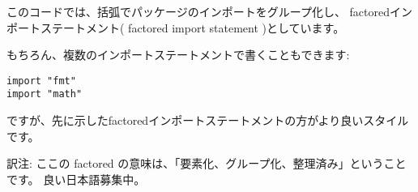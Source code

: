このコードでは、括弧でパッケージのインポートをグループ化し、
factoredインポートステートメント( factored import statement )としています。

もちろん、複数のインポートステートメントで書くこともできます:

\begin{lstlisting}[firstnumber=3]
import "fmt"
import "math"
\end{lstlisting}

ですが、先に示したfactoredインポートステートメントの方がより良いスタイルです。

訳注: ここの factored の意味は、「要素化、グループ化、整理済み」ということです。
良い日本語募集中。
